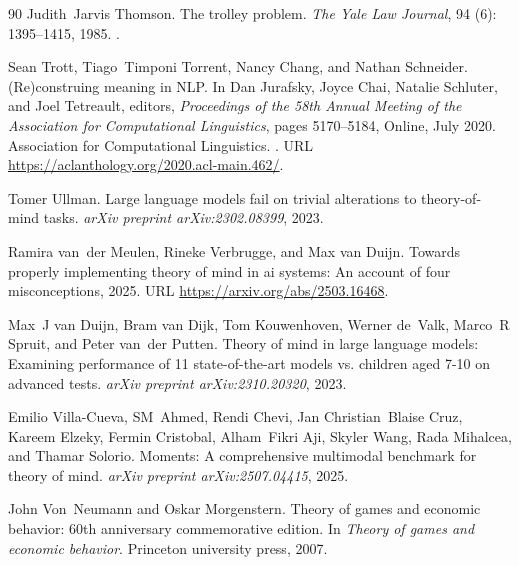 \begin{thebibliography}{90}
Judith~Jarvis Thomson.
\newblock The trolley problem.
\newblock \emph{The Yale Law Journal}, 94 (6): 1395--1415, 1985.
\newblock {}.

Sean Trott, Tiago~Timponi Torrent, Nancy Chang, and Nathan Schneider.
\newblock ({R}e)construing meaning in {NLP}.
\newblock In Dan Jurafsky, Joyce Chai, Natalie Schluter, and Joel Tetreault, editors, \emph{Proceedings of the 58th Annual Meeting of the Association for Computational Linguistics}, pages 5170--5184, Online, July 2020. Association for Computational Linguistics.
\newblock {}.
\newblock URL \url{https://aclanthology.org/2020.acl-main.462/}.

Tomer Ullman.
\newblock Large language models fail on trivial alterations to theory-of-mind tasks.
\newblock \emph{arXiv preprint arXiv:2302.08399}, 2023.

Ramira van~der Meulen, Rineke Verbrugge, and Max van Duijn.
\newblock Towards properly implementing theory of mind in ai systems: An account of four misconceptions, 2025.
\newblock URL \url{https://arxiv.org/abs/2503.16468}.

Max~J van Duijn, Bram van Dijk, Tom Kouwenhoven, Werner de~Valk, Marco~R Spruit, and Peter van~der Putten.
\newblock Theory of mind in large language models: Examining performance of 11 state-of-the-art models vs. children aged 7-10 on advanced tests.
\newblock \emph{arXiv preprint arXiv:2310.20320}, 2023.

Emilio Villa-Cueva, SM~Ahmed, Rendi Chevi, Jan Christian~Blaise Cruz, Kareem Elzeky, Fermin Cristobal, Alham~Fikri Aji, Skyler Wang, Rada Mihalcea, and Thamar Solorio.
\newblock Moments: A comprehensive multimodal benchmark for theory of mind.
\newblock \emph{arXiv preprint arXiv:2507.04415}, 2025.

John Von~Neumann and Oskar Morgenstern.
\newblock Theory of games and economic behavior: 60th anniversary commemorative edition.
\newblock In \emph{Theory of games and economic behavior}. Princeton university press, 2007.


\end{thebibliography}
